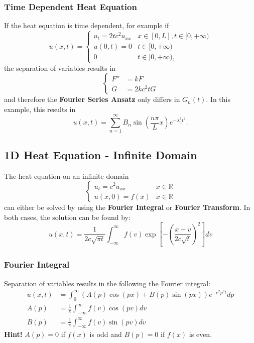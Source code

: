\subsubsection{Time Dependent Heat Equation}
If the heat equation is time dependent, for example if
\begin{equation*}
    u(x,t)=
    \begin{cases}u_t=2tc^2u_{xx} & x\in[0,L],t\in[0,+\infty) \\%
             u(0,t)=0        & t\in[0,+\infty)           \\%
             0               & t\in[0,+\infty),          %
    \end{cases}
\end{equation*}
the separation of variables results in
\begin{equation*}
    \begin{cases}
        F''     & =kF      \\
        \dot{G} & =2kc^2tG
    \end{cases}
\end{equation*}
and therefore the \textbf{Fourier Series Ansatz} only differs in $G_n(t)$.
In this example, this results in
\begin{equation*}
    u(x,t) =\sum_{n=1}^\infty B_n\sin(\frac{n\pi}Lx)e^{-\lambda_n^2t^2}.
\end{equation*}

\subsection{1D Heat Equation - Infinite Domain}
The heat equation on an infinite domain
\begin{equation*}
    \begin{cases}
        u_t=c^2u_{xx} & x\in \mathbb{R} \\
        u(x,0)=f(x)   & x\in \mathbb{R}
    \end{cases}
\end{equation*}
can either be solved by using the \textbf{Fourier Integral} or \textbf{Fourier Transform}.
In both cases, the solution can be found by:
\begin{equation*}
    u(x,t)=\frac{1}{2c\sqrt{\pi t}}\int_{-\infty}^{\infty}f(v)\exp\left[-\left(\frac{x-v}{2c\sqrt{t}}\right)^{2}\right]dv
\end{equation*}


\subsubsection{Fourier Integral}
Separation of variables results in the following the Fourier integral:
\begin{align*}
    u(x,t) & =\int_0^\infty(A(p)\cos(px)+B(p)\sin(px))e^{-c^2p^2t}dp \\
    A(p)   & =\frac1\pi\int_{-\infty}^\infty f(v)\cos(pv)dv          \\
    B(p)   & =\frac1\pi\int_{-\infty}^\infty f(v)\sin(pv)dv
\end{align*}
\textbf{Hint!} $A(p)=0$ if $f(x)$ is odd and $B(p)=0$ if $f(x)$ is even.



